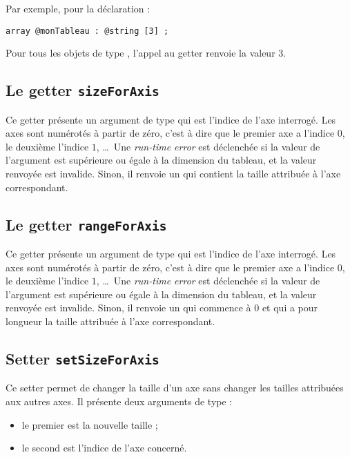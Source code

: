 Par exemple, pour la déclaration :
\begin{lstlisting}[language=galgas]
array @monTableau : @string [3] ;
\end{lstlisting}
Pour tous les objets de type , l'appel au getter  renvoie la valeur $3$.


\subsection{Le getter \texttt{sizeForAxis}}

Ce getter présente un argument de type  qui est l'indice de l'axe interrogé. Les axes sont numérotés à partir de zéro, c'est à dire que le premier axe a l'indice $0$, le deuxième l'indice $1$, \dots~Une \emph{run-time error} est déclenchée si la valeur de l'argument est supérieure ou égale à la dimension du tableau, et la valeur renvoyée est invalide. Sinon, il renvoie un  qui contient la taille attribuée à l'axe correspondant.


\subsection{Le getter \texttt{rangeForAxis}}

Ce getter présente un argument de type  qui est l'indice de l'axe interrogé. Les axes sont numérotés à partir de zéro, c'est à dire que le premier axe a l'indice $0$, le deuxième l'indice $1$, \dots~Une \emph{run-time error} est déclenchée si la valeur de l'argument est supérieure ou égale à la dimension du tableau, et la valeur renvoyée est invalide. Sinon, il renvoie un  qui commence à $0$ et qui a pour longueur la taille attribuée à l'axe correspondant.




\subsection{Setter \texttt{setSizeForAxis}}

Ce setter permet de changer la taille d'un axe sans changer les tailles attribuées aux autres axes. Il présente deux arguments de type  :
\begin{itemize}
  \item le premier est la nouvelle taille ;
  \item le second est l'indice de l'axe concerné.
\end{itemize}

